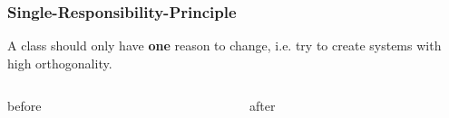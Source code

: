 \documentclass[9pt]{beamer}
\begin{document}
\begin{frame}
  \frametitle{Single-Responsibility-Principle}
  \begin{theorem}
    A class should only have \textbf{one} reason to change, i.e. try to create systems with high orthogonality.
  \end{theorem}
\vfill
\pause
  \begin{columns}[t]
    \begin{column}{.48\textwidth}
       \begin{block}{before}

          \begin{center}
          \end{center}
       \end{block}
    \end{column}
\hfill
    \begin{column}{.48\textwidth}
       \begin{block}{after}
       \begin{center}
       \end{center}
      \end{block}
    \end{column}
  \end{columns}
\end{frame}
\end{document}
